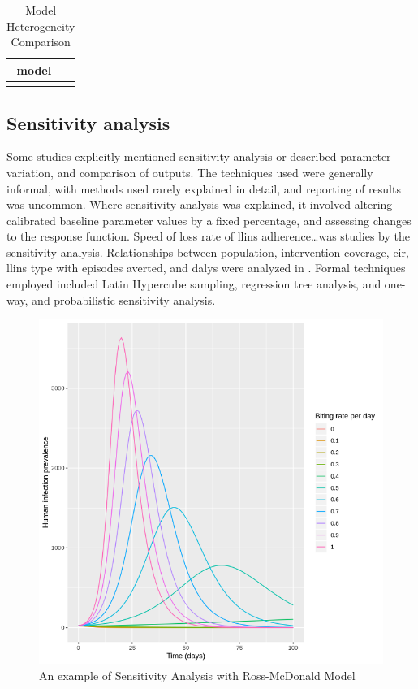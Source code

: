 \documentclass[a4paper, 12pt, twoside]{article}
\begin{document}
\begin{table}[htpb]
	\centering
	\caption{Model Heterogeneity Comparison}
	\label{tab:model_heterogeneity_comparison}
	\begin{tabular}{cc}
		\toprule
		model             & \\
		\midrule
		\cite{White2018b} & \\
		\bottomrule
	\end{tabular}
\end{table}

\subsection{Sensitivity analysis}%
\label{par:sensitivity_analysis}
Some studies\cite{Briet2013,Mohammed-Awel2019, White2018b} explicitly mentioned sensitivity analysis or described parameter variation, and comparison of outputs.
The techniques used were generally informal, with methods used rarely explained in detail, and reporting of results was uncommon.
Where sensitivity analysis was explained, it involved altering calibrated baseline parameter values by a fixed percentage, and assessing changes to the response function.
Speed of loss rate of \gls{llins} adherence\cite{White2018b}\ldots was studies by the sensitivity analysis.
Relationships between population, intervention coverage, \gls{eir}, \gls{llins} type with episodes averted, and \gls{dalys} were analyzed in \cite{Briet2013}.
Formal techniques employed included Latin Hypercube sampling, regression tree analysis, and one-way, and probabilistic sensitivity analysis.

\begin{figure}[htpb]
	\centering
	\includegraphics[width=\textwidth]{ross-mcdonald-sensitivity}
	\caption{An example of Sensitivity Analysis with Ross-McDonald Model}
	\label{fig:ross-mcdonald-sensitivity}
\end{figure}
\end{document}
